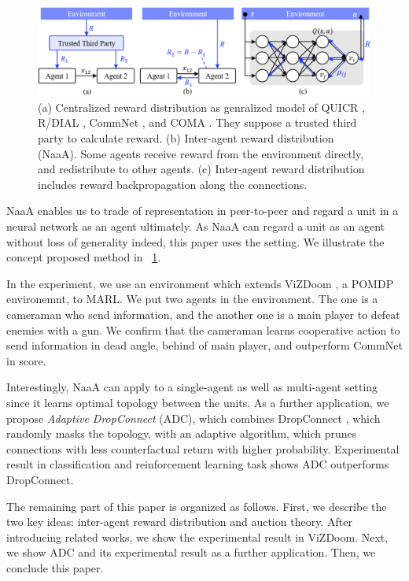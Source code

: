 \begin{figure}[tb]
	\centering
	\includegraphics[width=\linewidth]{img/TTP.eps}
	\caption{
		(a) Centralized reward distribution as genralized model of 
			QUICR \citep{agogino2006quicr}, R/DIAL \citep{foerster2016learning}, CommNet \citep{sukhbaatar2016learning}, 
			and COMA \citep{foerster2016learning}. 
			They suppose a trusted third party to calculate reward.
		(b) Inter-agent reward distribution (NaaA). Some agents receive reward from the environment directly,  
			and redistribute to other agents. 
		(c) Inter-agent reward distribution includes reward backpropagation along the connections. 
	}
	\label{fig:ttp}
\end{figure}

NaaA enables us to trade of representation in peer-to-peer and regard a unit in a neural network as an agent ultimately.
As NaaA can regard a unit as an agent without loss of generality indeed, this paper uses the setting.
We illustrate the concept proposed method in \figurename~\ref{fig:ttp}.

In the experiment, we use an environment which extends ViZDoom \citep{kempka2016vizdoom}, a POMDP environemnt, to MARL.
We put two agents in the environment.
The one is a cameraman who send information, and the another one is a main player to defeat enemies with a gun.
We confirm that the cameraman learns cooperative action to send information in dead angle, behind of main player, and outperform CommNet in score.

Interestingly, NaaA can apply to a single-agent as well as multi-agent setting since it learns optimal topology between the units. %
As a further application, we propose {\em Adaptive DropConnect} (ADC), which combines DropConnect \citep{wan2013regularization}, which randomly masks the topology, with an adaptive algorithm, which prunes connections with less counterfactual return with higher probability.
Experimental result in classification and reinforcement learning task shows ADC outperforms DropConnect.

The remaining part of this paper is organized as follows. 
First, we describe the two key ideas: inter-agent reward distribution and auction theory. 
After introducing related works, we show the experimental result in ViZDoom.
Next, we show ADC and its experimental result as a further application. 
Then, we conclude this paper.
